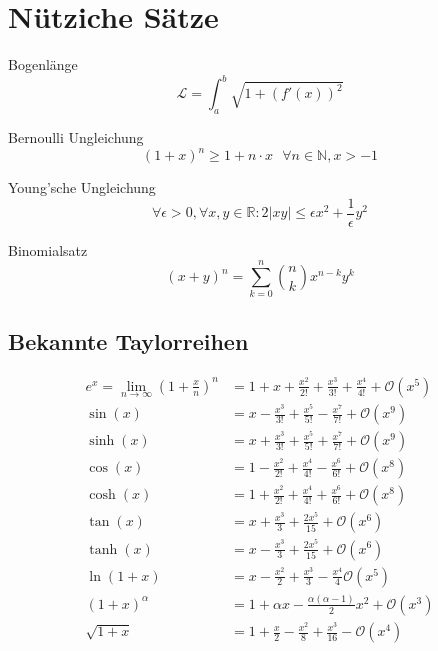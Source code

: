 \documentclass[a4paper,8pt]{extarticle}
\def\R{\mathbb{R}}
\begin{document}
\section{Nütziche Sätze}

\begin{subbox}{Bogenlänge}
  $$\mathcal{L} = \int_a^b \sqrt{1 + (f'(x))^2}$$ 
\end{subbox}

\begin{subbox}{Bernoulli Ungleichung}
  $$(1 + x)^n \geq 1 + n \cdot x \ \ \ \forall n \in \mathbb{N}, x > -1$$
\end{subbox}

\begin{subbox}{Young'sche Ungleichung}
  $$\forall \epsilon > 0, \forall x, y \in \R: 2|xy| \leq \epsilon x^2 + \frac{1}{\epsilon} y^2$$
\end{subbox}

\begin{subbox}{Binomialsatz}
  $$(x + y)^n = \sum_{k = 0}^n {n \choose k} x^{n-k}y^k$$
\end{subbox}

\subsection{Bekannte Taylorreihen}
\begin{align*}
  e^x = \lim_{n \to \infty} \left(1 + \frac{x}{n} \right)^n & = 1 + x + \frac{x^2}{2!} + \frac{x^3}{3!} + \frac{x^4}{4!} + \mathcal{O}(x^5) \\
  \sin(x) & = x - \frac{x^3}{3!} + \frac{x^5}{5!} - \frac{x^7}{7!} + \mathcal{O}(x^9) \\ 
  \sinh(x) & = x + \frac{x^3}{3!} + \frac{x^5}{5!} + \frac{x^7}{7!} + \mathcal{O}(x^9) \\ 
  \cos(x) & = 1 - \frac{x^2}{2!} + \frac{x^4}{4!} - \frac{x^6}{6!} + \mathcal{O}(x^8) \\  
  \cosh(x) & = 1 + \frac{x^2}{2!} + \frac{x^4}{4!} + \frac{x^6}{6!} + \mathcal{O}(x^8) \\  
  \tan(x) & = x + \frac{x^3}{3} + \frac{2x^5}{15} + \mathcal{O}(x^6) \\ 
  \tanh(x) & = x - \frac{x^3}{3} + \frac{2x^5}{15} + \mathcal{O}(x^6) \\ 
  \ln(1 + x) & = x - \frac{x^2}{2} + \frac{x^3}{3} - \frac{x^4}{4} \mathcal{O}(x^5) \\
  (1 + x)^\alpha & = 1 + \alpha x - \frac{\alpha (\alpha - 1)}{2}x^2 + \mathcal{O}(x^3) \\ 
  \sqrt{1 + x} & = 1 + \frac{x}{2} - \frac{x^2}{8} + \frac{x^3}{16} - \mathcal{O}(x^4) \\
\end{align*}
\end{document}
